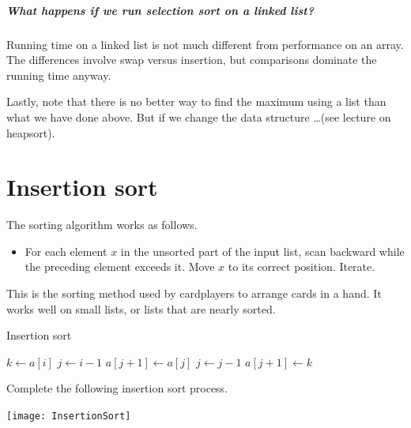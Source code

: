 \paragraph{What happens if we run selection sort on a linked list?}
Running time on a linked list is not much different from performance on an array. 
The differences involve swap versus insertion, but comparisons dominate the running time anyway.

Lastly, note that there is no better way to find the maximum using a list than what we have done above. 
But if we change the data structure \dots (see lecture on heapsort).



\chapter{Insertion sort} %
\label{sec:insertionsort}
The sorting algorithm  works as follows.
\begin{itemize}
	\item  For each element $x$ in the unsorted part of the input list, scan backward while the preceding element 
	exceeds it. Move $x$ to its correct position. Iterate.
\end{itemize}
This is the sorting method used by cardplayers to arrange cards in a hand.
It works well on small lists, or lists that are nearly sorted.

\begin{algorithm}[H]
  \caption{Insertion sort
    \label{alg:insort}}
\begin{algorithmic}[1]
\State $k \gets a[i]$ 
\State $j \gets i - 1$
\State {}
\State $a[j+1] \gets a[j]$
\State $j \gets j - 1$
\EndWhile
\State $a[j+1] \gets k$ 
\EndFor
\State {}
\EndFunction  
\end{algorithmic}
\end{algorithm}

\begin{Boxample}[0]
Complete the following insertion sort process.
\begin{center}
\texttt{[image: InsertionSort]}
\end{center}
\end{Boxample}

